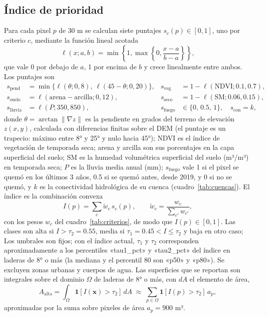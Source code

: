 \subsection{Índice de prioridad}

Para cada pixel $p$ de 30 m se calculan siete puntajes $s_c(p)\in[0,1]$, uno por criterio $c$, mediante la función lineal acotada
\begin{equation}
\ell(x;a,b)=\min\left\{1,\max\left\{0,\frac{x-a}{b-a}\right\}\right\},
\end{equation}
que vale 0 por debajo de $a$, 1 por encima de $b$ y crece linealmente entre ambos. Los puntajes son
\begin{equation}
\begin{aligned}
s_{\text{pend}} &= \min\{\ell(\theta;0,8),\ \ell(45-\theta;0,20)\}, &
s_{\text{veg}} &= 1-\ell(\text{NDVI};0.1,0.7),\\
s_{\text{suelo}} &= \ell(\text{arena}-\text{arcilla};0,12), &
s_{\text{seco}} &= 1-\ell(\text{SM};0.06,0.15),\\
s_{\text{lluvia}} &= \ell(P;350,850), &
s_{\text{fuego}} &\in\{0,\,0.5,\,1\},\quad s_{\text{con}}=k,
\end{aligned}
\end{equation}
donde $\theta=\arctan\lVert\nabla z\rVert$ es la pendiente en grados del terreno de elevación $z(x,y)$, calculada con diferencias finitas sobre el DEM (el puntaje es un trapecio: máximo entre 8° y 25° y nulo hacia 45°); NDVI es el índice de vegetación de temporada seca; arena y arcilla son sus porcentajes en la capa superficial del suelo; SM es la humedad volumétrica superficial del suelo (m³/m³) en temporada seca; $P$ es la lluvia media anual (mm); $s_{\text{fuego}}$ vale 1 si el pixel se quemó en los últimos 3 años, 0.5 si se quemó antes, desde 2019, y 0 si no se quemó, y $k$ es la conectividad hidrológica de su cuenca (cuadro~\ref{tab:cuencas}). El índice es la combinación convexa
\begin{equation}
I(p)=\sum_c \tilde w_c\, s_c(p),\qquad \tilde w_c = \frac{w_c}{\sum_{c'} w_{c'}},
\end{equation}
con los pesos $w_c$ del cuadro~\ref{tab:criterios}, de modo que $I(p)\in[0,1]$. Las clases son alta si $I>\tau_2=0.55$, media si $\tau_1=0.45<I\le\tau_2$ y baja en otro caso; Los umbrales son fijos; con el índice actual, $\tau_1$ y $\tau_2$ corresponden aproximadamente a los percentiles «tau1_pct» y «tau2_pct» del índice en laderas de 8° o más (la mediana y el percentil 80 son «p50» y «p80»). Se excluyen zonas urbanas y cuerpos de agua. Las superficies que se reportan son integrales sobre el dominio $\Omega$ de laderas de 8° o más, con $dA$ el elemento de área,
\begin{equation}
A_{\text{alta}}=\int_{\Omega}\mathbf 1\!\left[I(\mathbf x)>\tau_2\right]\,dA \;\approx\; \sum_{p\in\Omega}\mathbf 1\!\left[I(p)>\tau_2\right]\,a_p ,
\end{equation}
aproximadas por la suma sobre pixeles de área $a_p=900$ m².

